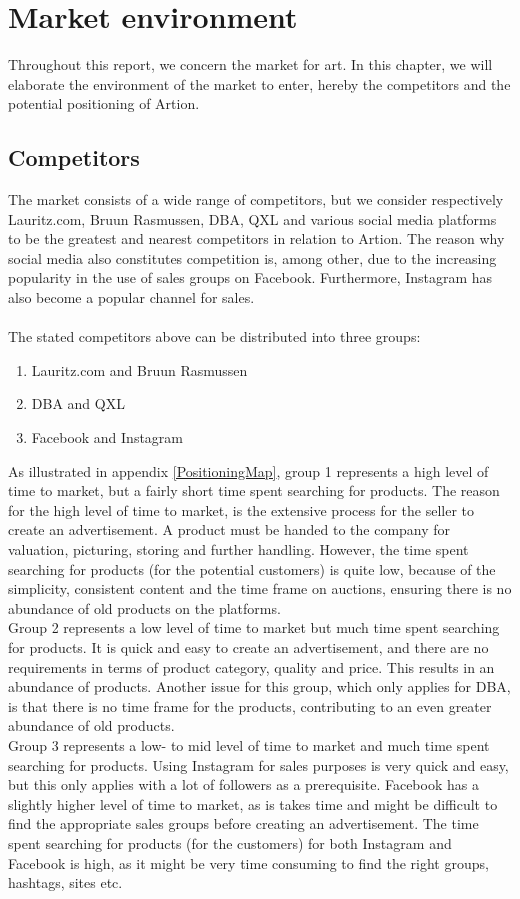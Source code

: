 \section{Market environment}
Throughout this report, we concern the market for art. In this chapter, we will elaborate the environment of the market to enter, hereby the competitors and the potential positioning of Artion. 

\subsection{Competitors}
The market consists of a wide range of competitors, but we consider respectively Lauritz.com, Bruun Rasmussen, DBA, QXL and various social media platforms to be the greatest and nearest competitors in relation to Artion. The reason why social media also constitutes competition is, among other, due to the increasing popularity in the use of sales groups on Facebook. Furthermore, Instagram has also become a popular channel for sales. 
\\\\
The stated competitors above can be distributed into three groups:

\begin{enumerate}
\item Lauritz.com and Bruun Rasmussen
\item DBA and QXL
\item Facebook and Instagram
\end{enumerate}

As illustrated in appendix \ref{PositioningMap}, group 1 represents a high level of time to market, but a fairly short time spent searching for products. The reason for the high level of time to market, is the extensive process for the seller to create an advertisement. A product must be handed to the company for valuation, picturing, storing and further handling. However, the time spent searching for products (for the potential customers) is quite low, because of the simplicity, consistent content and the time frame on auctions, ensuring there is no abundance of old products on the platforms.\\
\forceindent Group 2 represents a low level of time to market but much time spent searching for products. It is quick and easy to create an advertisement, and there are no requirements in terms of product category, quality and price. This results in an abundance of products. Another issue for this group, which only applies for DBA, is that there is no time frame for the products, contributing to an even greater abundance of old products.\\
\forceindent Group 3 represents a low- to mid level of time to market and much time spent searching for products. Using Instagram for sales purposes is very quick and easy, but this only applies with a lot of followers as a prerequisite. Facebook has a slightly higher level of time to market, as is takes time and might be difficult to find the appropriate sales groups before creating an advertisement. The time spent searching for products (for the customers) for both Instagram and Facebook is high, as it might be very time consuming to find the right groups, hashtags, sites etc.

